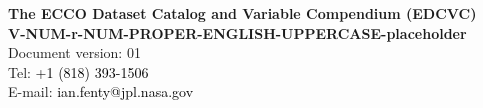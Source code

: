 \pagebreak
\begin{center}
    \vspace*{2cm}
    {\Large \textbf{The ECCO Dataset Catalog and Variable Compendium (EDCVC)}}\\[3cm]
    {\LARGE \textbf{V-NUM-r-NUM-PROPER-ENGLISH-UPPERCASE-placeholder}}\\[2.5cm]
    {\Large Document version: 01}\\[4cm]
    {\large Tel: \textcolor{black}{+1 (818) 393-1506}\\[.5cm]
    E-mail: \textcolor{black}{ian.fenty@jpl.nasa.gov}}\\[2cm]
\end{center}
\newpage

